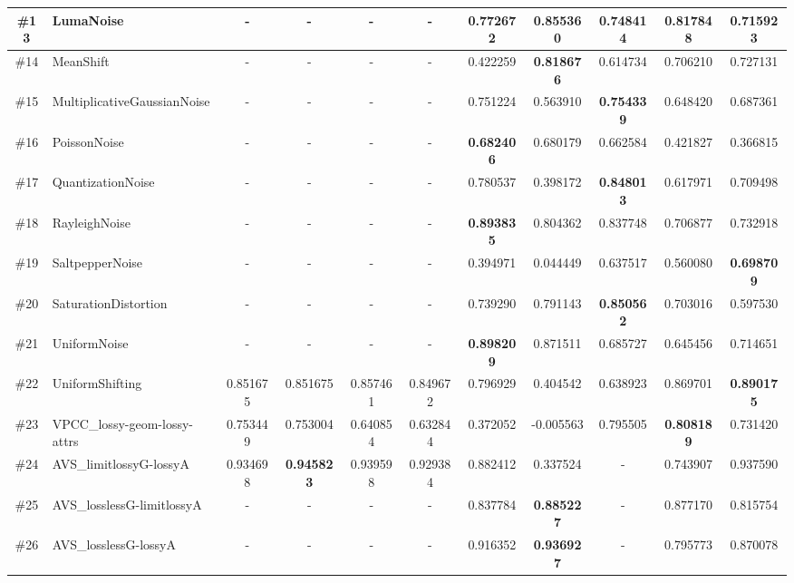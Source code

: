 \documentclass[acmsmall]{acmart}
\begin{document}
\begin{table*}[t]
{\begin{tabular}{c|p{8em}|c|c|c|c|c|c|c|c|c}
    \hline
    \#13  & LumaNoise & -     & -     & -     & -     & 0.772672 & \textbf{0.855360} & 0.748414 & 0.817848 & 0.715923  \\
    \hline
    \#14  & MeanShift & -     & -     & -     & -     & 0.422259 & \textbf{0.818676} & 0.614734 & 0.706210 & 0.727131  \\
    \hline
    \#15  & Multiplicative\newline{}GaussianNoise & -     & -     & -     & -     & 0.751224 & 0.563910 & \textbf{0.754339} & 0.648420 & 0.687361  \\
    \hline
    \#16  & PoissonNoise & -     & -     & -     & -     & \textbf{0.682406} & 0.680179 & 0.662584 & 0.421827 & 0.366815  \\
    \hline
    \#17  & QuantizationNoise & -     & -     & -     & -     & 0.780537 & 0.398172 & \textbf{0.848013} & 0.617971 & 0.709498  \\
    \hline
    \#18  & RayleighNoise & -     & -     & -     & -     & \textbf{0.893835} & 0.804362 & 0.837748 & 0.706877 & 0.732918  \\
    \hline
    \#19  & SaltpepperNoise & -     & -     & -     & -     & 0.394971 & 0.044449 & 0.637517 & 0.560080 & \textbf{0.698709 } \\
    \hline
    \#20  & SaturationDistortion & -     & -     & -     & -     & 0.739290 & 0.791143 & \textbf{0.850562} & 0.703016 & 0.597530  \\
    \hline
    \#21  & UniformNoise & -     & -     & -     & -     & \textbf{0.898209} & 0.871511 & 0.685727 & 0.645456 & 0.714651  \\
    \hline
    \#22  & UniformShifting & 0.851675 & 0.851675 & 0.857461 & 0.849672 & 0.796929 & 0.404542 & 0.638923 & 0.869701 & \textbf{0.890175 } \\
    \hline
    \#23  & VPCC\_lossy-geom-lossy-attrs & 0.753449 & 0.753004 & 0.640854 & 0.632844 & 0.372052 & -0.005563 & 0.795505 & \textbf{0.808189} & 0.731420  \\
    \hline
    \#24  & AVS\_limitlossyG-lossyA & 0.934698 & \textbf{0.945823} & 0.939598 & 0.929384 & 0.882412 & 0.337524 & -     & 0.743907 & 0.937590  \\
    \hline
    \#25  & AVS\_losslessG-limitlossyA & -     & -     & -     & -     & 0.837784 & \textbf{0.885227} & -     & 0.877170 & 0.815754  \\
    \hline
    \#26  & AVS\_losslessG-lossyA & -     & -     & -     & -     & 0.916352 & \textbf{0.936927} & -     & 0.795773 & 0.870078  \\

\end{tabular}}
\end{table*}
\end{document}
